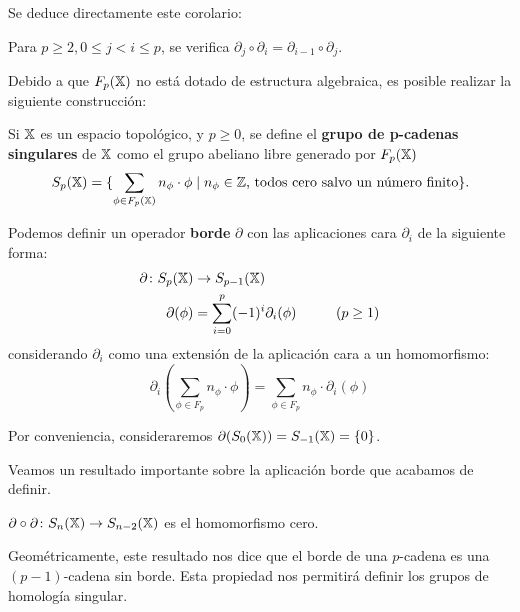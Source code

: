 Se deduce directamente este corolario:

\begin{corollary}
  Para $p \geq 2, 0 \leq j < i \leq p$, se verifica $\partial_j \circ \partial_i = \partial_{i-1} \circ \partial_j$.
\end{corollary}

Debido a que $F_{p}({\mathbb X})$ no está dotado de estructura algebraica, es posible realizar la siguiente construcción:

\begin{definition}
  Si ${\mathbb X}$ es un espacio topológico, y $p \geq 0$, se define el \textbf{grupo de p-cadenas singulares} de ${\mathbb X}$
  como el grupo abeliano libre generado por $F_{p}({\mathbb X})$
  \[ S_p({\mathbb X}) = \{\sum_{\phi \in F_{p}({\mathbb X})} n_\phi \cdot \phi  \mid n_\phi \in \mathbb{Z} \text{, todos cero salvo un número finito} \}.\]

  Podemos definir un operador \textbf{borde} $\partial$ con las aplicaciones cara $\partial_i$ de la siguiente forma:
  \begin{align*}
    \partial \colon S_p({\mathbb X}) &\to S_{p-1}({\mathbb X})\\
    \partial(\phi) &= \sum_{i = 0}^p (-1)^i \partial_i(\phi)  \hspace{1cm} (p \geq 1)
  \end{align*}
  considerando $\partial_i$ como una extensión de la aplicación cara a un homomorfismo:
  \[\partial_i(\sum_{\phi \in F_p} n_\phi \cdot \phi) = \sum_{\phi \in F_p} n_\phi \cdot \partial_i(\phi) \]
\end{definition}

Por conveniencia, consideraremos $\partial(S_0({\mathbb X})) = S_{-1}({\mathbb X}) = \{0\}$.

Veamos un resultado importante sobre la aplicación borde que acabamos de definir.

\begin{proposition}
  $\partial \circ \partial \colon S_{n}({\mathbb X}) \to S_{n-2}({\mathbb X})$ es el homomorfismo cero.
\end{proposition}

Geométricamente, este resultado nos dice que el borde de una $p$-cadena es una $(p-1)$-cadena sin
borde. Esta propiedad nos permitirá definir los grupos de homología singular.

